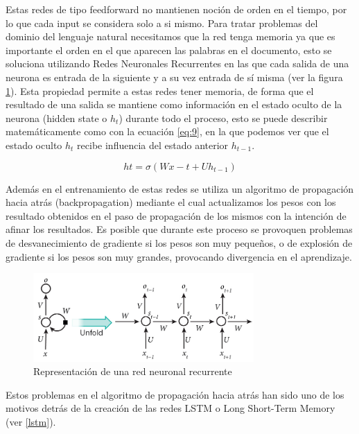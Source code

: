 Estas redes de tipo feedforward no mantienen noción de orden en el tiempo, por lo que cada input se considera solo a si mismo. Para tratar problemas del dominio del lenguaje natural necesitamos que la red tenga memoria ya que es importante el orden en el que aparecen las palabras en el documento, esto se soluciona utilizando Redes Neuronales Recurrentes en las que cada salida de una neurona es entrada de la siguiente y a su vez entrada de sí misma (ver la figura \ref{rnn}). Esta propiedad permite a estas redes tener memoria, de forma que el resultado de una salida se mantiene como información en el estado oculto de la neurona (hidden state o \(h_t\)) durante todo el proceso, esto se puede describir matemáticamente como con la ecuación \ref{eq:9}, en la que podemos ver que el estado oculto \(h_t\) recibe influencia del estado anterior \(h_{t - 1}\).

\begin{equation} \label{eq:9}
ht = \sigma(Wx-t + Uh_{t-1})
\end{equation}

Además en el entrenamiento de estas redes se utiliza un algoritmo de propagación hacia atrás (backpropagation) mediante el cual actualizamos los pesos con los resultado obtenidos en el paso de propagación de los mismos con la intención de afinar los resultados. Es posible que durante este proceso se provoquen problemas de desvanecimiento de gradiente si los pesos son muy pequeños, o de explosión de gradiente si los pesos son muy grandes, provocando divergencia en el aprendizaje.

\begin{figure}[!ht]
	\centering
	\includegraphics[width=0.75\textwidth]{imaxes/rnn.jpg}
	\caption{Representación de una red neuronal recurrente}
	\label{rnn}
\end{figure}

Estos problemas en el algoritmo de propagación hacia atrás han sido uno de los motivos detrás de la creación de las redes LSTM o Long Short-Term Memory (ver \ref{lstm}).

